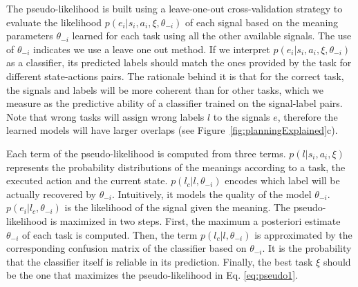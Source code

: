 The pseudo-likelihood is built using a leave-one-out cross-validation strategy to evaluate the likelihood $p(e_i | s_i, a_i, \xi, \theta_{-i})$ of each signal based on the meaning parameters $\theta_{-i}$ learned for each task using all the other available signals. The use of $\theta_{-i}$ indicates we use a leave one out method. If we interpret $p(e_i | s_i,a_i,\xi,\theta_{-i})$ as a classifier, its predicted labels should match the ones provided by the task for different state-actions pairs. The rationale behind it is that for the correct task, the signals and labels will be more coherent than for other tasks, which we measure as the predictive ability of a classifier trained on the signal-label pairs. Note that wrong tasks will assign wrong labels $l$ to the signals $e$, therefore the learned models will have larger overlaps (see Figure~\ref{fig:planningExplained}c). 


Each term of the pseudo-likelihood is computed from three terms. $p(l|s_i,a_i,\xi)$ represents the probability distributions of the meanings according to a task, the executed action and the current state.   $p(l_c | l, \theta_{-i})$ encodes which label will be actually recovered by $\theta_{-i}$. Intuitively, it models the quality of the model $\theta_{-i}$. $p(e_i | l_c,\theta_{-i})$ is the likelihood of the signal given the meaning. 
%
The pseudo-likelihood is maximized in two steps. First, the maximum a posteriori estimate $\theta_{-i}$ of each task is computed. Then, the term $p(l_c | l, \theta_{-i})$ is approximated by the corresponding confusion matrix of the classifier based on $\theta_{-i}$. It is the probability that the classifier itself is reliable in its prediction. Finally, the best task $\xi$ should be the one that maximizes the pseudo-likelihood in Eq. \ref{eq:pseudo1}.

